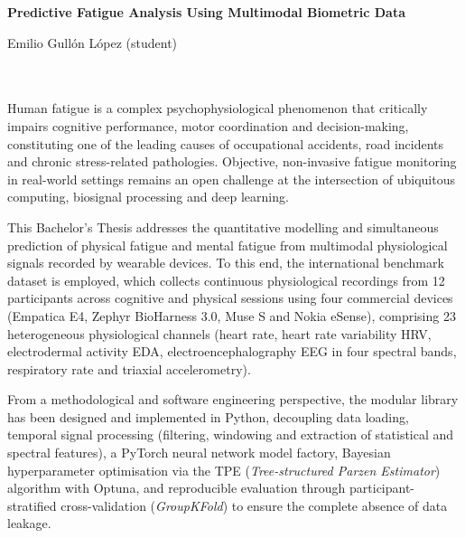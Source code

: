 \begin{center}
{\large\bfseries Predictive Fatigue Analysis Using Multimodal Biometric Data}\\
\end{center}
\begin{center}
Emilio Gullón López (student)\\
\end{center}

\vspace{0.5cm}
\\

\vspace{0.7cm}
\\

Human fatigue is a complex psychophysiological phenomenon that critically impairs cognitive performance, motor coordination and decision-making, constituting one of the leading causes of occupational accidents, road incidents and chronic stress-related pathologies. Objective, non-invasive fatigue monitoring in real-world settings remains an open challenge at the intersection of ubiquitous computing, biosignal processing and deep learning.

This Bachelor's Thesis addresses the quantitative modelling and simultaneous prediction of physical fatigue and mental fatigue from multimodal physiological signals recorded by wearable devices. To this end, the international benchmark dataset \fatigueset{} is employed, which collects continuous physiological recordings from 12 participants across cognitive and physical sessions using four commercial devices (Empatica E4, Zephyr BioHarness 3.0, Muse S and Nokia eSense), comprising 23 heterogeneous physiological channels (heart rate, heart rate variability HRV, electrodermal activity EDA, electroencephalography EEG in four spectral bands, respiratory rate and triaxial accelerometry).

From a methodological and software engineering perspective, the modular library  has been designed and implemented in Python, decoupling data loading, temporal signal processing (filtering, windowing and extraction of statistical and spectral features), a PyTorch neural network model factory, Bayesian hyperparameter optimisation via the TPE (\textit{Tree-structured Parzen Estimator}) algorithm with Optuna, and reproducible evaluation through participant-stratified cross-validation (\textit{GroupKFold}) to ensure the complete absence of data leakage.

